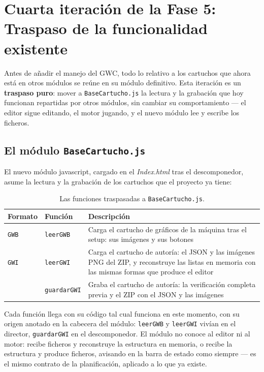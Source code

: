 \section{Cuarta iteración de la Fase 5: Traspaso de la funcionalidad existente}
\label{sec:F5I4}

Antes de añadir el manejo del GWC, todo lo relativo a los cartuchos que ahora está en otros módulos se reúne en su módulo definitivo. Esta iteración es un
\textbf{traspaso puro}: mover a \texttt{BaseCartucho.js} la
lectura y la grabación que hoy funcionan repartidas por otros
módulos, sin cambiar su comportamiento — el editor sigue
editando, el motor jugando, y el nuevo módulo lee y escribe los
ficheros.


\subsection{El módulo \texttt{BaseCartucho.js}}
\label{sec:F5I4Modulo}

El nuevo módulo javascript, cargado en el \emph{Index.html} tras el descomponedor, asume la lectura y la grabación de los cartuchos que el proyecto ya tiene:

\begin{table}[H]
	\centering
	\begin{tabularx}{\textwidth}{@{}l l X@{}}
		\toprule
		\textbf{Formato} & \textbf{Función} & \textbf{Descripción} \\
		\midrule
		
		\texttt{GWB} & \texttt{leerGWB} & Carga el cartucho de gráficos de
		la máquina tras el setup: sus imágenes y sus botones \\
		
		\texttt{GWI} & \texttt{leerGWI} & Carga el cartucho de autoría: el
		JSON y las imágenes PNG del ZIP, y reconstruye las listas en
		memoria con las mismas formas que produce el editor \\
		
		& \texttt{guardarGWI} & Graba el cartucho de autoría: la
		verificación completa previa y el ZIP con el JSON y las
		imágenes \\
		\bottomrule
	\end{tabularx}
	\caption{Las funciones traspasadas a \texttt{BaseCartucho.js}.}
	\label{tab:funcionesTraspaso}
\end{table}

Cada función llega con su código tal cual funciona en este momento, con su origen anotado en la cabecera del módulo: \texttt{leerGWB} y \texttt{leerGWI} vivían en el director, \texttt{guardarGWI} en el descomponedor. El módulo no conoce al editor ni al motor: recibe ficheros y reconstruye la estructura en memoria, o recibe la estructura y produce ficheros, avisando en la barra de estado como siempre — es el mismo contrato de la planificación, aplicado a lo que ya existe.

